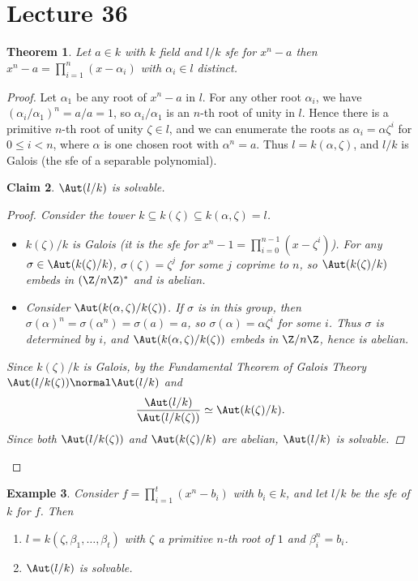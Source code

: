 \documentclass[a4paper,12pt]{article}
\newtheorem{thm}{Theorem}[section]
\newtheorem{eg}[thm]{Example}
\newtheorem{claim}[thm]{Claim}
\begin{document}
\section{Lecture 36}
\begin{thm}
    Let $a\in k$ with $k$ field and $l/k$ sfe for $x^n-a$ then $x^n-a=\prod_{i=1}^n (x-\alpha_i)$ with $\alpha_i\in l$ distinct. 
\end{thm}
\begin{proof}
    Let $\alpha_1$ be any root of $x^n-a$ in $l$. For any other root $\alpha_i$, we have $(\alpha_i/\alpha_1)^n=a/a=1$, so $\alpha_i/\alpha_1$ is an $n$-th root of unity in $l$. Hence there is a primitive $n$-th root of unity $\zeta\in l$, and we can enumerate the roots as $\alpha_i=\alpha\zeta^i$ for $0\leq i<n$, where $\alpha$ is one chosen root with $\alpha^n=a$. Thus $l=k(\alpha,\zeta)$, and $l/k$ is Galois (the sfe of a separable polynomial).
    \begin{claim}
        $\Aut(l/k)$ is solvable.
        \begin{proof}
            Consider the tower $k\subseteq k(\zeta)\subseteq k(\alpha,\zeta)=l$.
            \begin{itemize}
                \item $k(\zeta)/k$ is Galois (it is the sfe for $x^n-1=\prod_{i=0}^{n-1}(x-\zeta^i)$). For any $\sigma\in\Aut(k(\zeta)/k)$, $\sigma(\zeta)=\zeta^j$ for some $j$ coprime to $n$, so $\Aut(k(\zeta)/k)$ embeds in $(\Z/n\Z)^*$ and is abelian.
                \item Consider $\Aut(k(\alpha,\zeta)/k(\zeta))$. If $\sigma$ is in this group, then $\sigma(\alpha)^n=\sigma(\alpha^n)=\sigma(a)=a$, so $\sigma(\alpha)=\alpha\zeta^i$ for some $i$. Thus $\sigma$ is determined by $i$, and $\Aut(k(\alpha,\zeta)/k(\zeta))$ embeds in $\Z/n\Z$, hence is abelian.
            \end{itemize}
            Since $k(\zeta)/k$ is Galois, by the Fundamental Theorem of Galois Theory $\Aut(l/k(\zeta))\normal \Aut(l/k)$ and
            \[
            \frac{\Aut(l/k)}{\Aut(l/k(\zeta))}\simeq \Aut(k(\zeta)/k).
            \]
            Since both $\Aut(l/k(\zeta))$ and $\Aut(k(\zeta)/k)$ are abelian, $\Aut(l/k)$ is solvable.
        \end{proof}
    \end{claim}
\end{proof}
\begin{eg}
    Consider $f=\prod_{i=1}^t(x^n-b_i)$ with $b_i\in k$, and let $l/k$ be the sfe of $k$ for $f$. Then
    \begin{enumerate}
        \item $l=k(\zeta,\beta_1,\dots,\beta_t)$ with $\zeta$ a primitive $n$-th root of $1$ and $\beta_i^n=b_i$.
        \item $\Aut(l/k)$ is solvable.
    \end{enumerate}
\end{eg}
\end{document}
